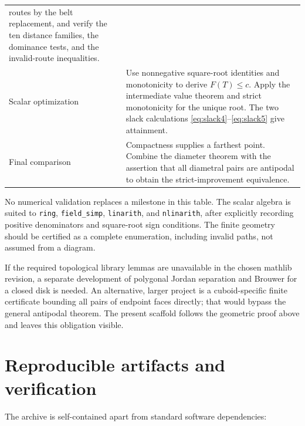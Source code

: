 \documentclass[11pt]{article}
\theoremstyle{definition}
\begin{document}
\begin{longtable}{p{.23\linewidth} p{.69\linewidth}}
routes by the belt replacement, and verify the ten distance families,
the dominance tests, and the invalid-route inequalities.
\\[4pt]
Scalar optimization&
Use nonnegative square-root identities and monotonicity to derive
\(F(T)\le c\). Apply the intermediate value theorem and strict
monotonicity for the unique root. The two slack calculations
\eqref{eq:slack4}--\eqref{eq:slack5} give attainment.
\\[4pt]
Final comparison&
Compactness supplies a farthest point. Combine the diameter theorem
with the assertion that all diametral pairs are antipodal to obtain
the strict-improvement equivalence.
\\
\bottomrule
\end{longtable}

No numerical validation replaces a milestone in this table.
The scalar algebra is suited to \texttt{ring}, \texttt{field\_simp},
\texttt{linarith}, and \texttt{nlinarith}, after explicitly recording
positive denominators and square-root sign conditions.
The finite geometry should be certified as a complete enumeration,
including invalid paths, not assumed from a diagram.

If the required topological library lemmas are unavailable in the
chosen mathlib revision, a separate development of polygonal Jordan
separation and Brouwer for a closed disk is needed. An alternative,
larger project is a cuboid-specific finite certificate bounding all
pairs of endpoint faces directly; that would bypass the general
antipodal theorem. The present scaffold follows the geometric proof
above and leaves this obligation visible.

\section{Reproducible artifacts and verification}
\label{sec:artifacts}

The archive is self-contained apart from standard software dependencies:
\end{document}
